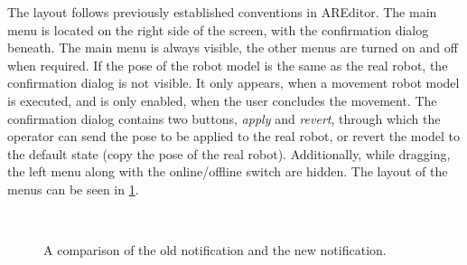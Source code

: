 The layout follows previously established conventions in AREditor. The main menu is located on the right side of the screen, with the confirmation dialog beneath. The main menu is always visible, the other menus are turned on and off when required. If the pose of the robot model is the same as the real robot, the confirmation dialog is not visible. It only appears, when a movement robot model is executed, and is only enabled, when the user concludes the movement. The confirmation dialog contains two buttons, \textit{apply} and \textit{revert}, through which the operator can send the pose to be applied to the real robot, or revert the model to the default state (copy the pose of the real robot). Additionally, while dragging, the left menu along with the online/offline switch are hidden. The layout of the menus can be seen in \ref{fig:layout}.

\begin{figure}
    \centering
    \\
    
    \caption{A comparison of the old notification and the new notification. }
    \label{fig:layout}
\end{figure}

